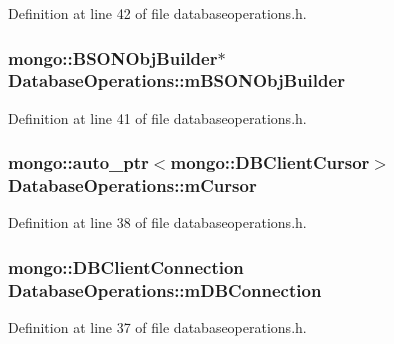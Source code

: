 Definition at line 42 of file databaseoperations.\-h.

\hypertarget{class_database_operations_ae6604cf6874bd9700ee3158c35945687}{
\subsubsection[{m\-B\-S\-O\-N\-Obj\-Builder}]{\setlength{\rightskip}{0pt plus 5cm}mongo\-::\-B\-S\-O\-N\-Obj\-Builder$\ast$ Database\-Operations\-::m\-B\-S\-O\-N\-Obj\-Builder\hspace{0.3cm}{\ttfamily [protected]}}}\label{class_database_operations_ae6604cf6874bd9700ee3158c35945687}


Definition at line 41 of file databaseoperations.\-h.

\hypertarget{class_database_operations_a0768987f8c116148aae4175cfc0df6bd}{
\subsubsection[{m\-Cursor}]{\setlength{\rightskip}{0pt plus 5cm}mongo\-::auto\-\_\-ptr$<$mongo\-::\-D\-B\-Client\-Cursor$>$ Database\-Operations\-::m\-Cursor\hspace{0.3cm}{\ttfamily [protected]}}}\label{class_database_operations_a0768987f8c116148aae4175cfc0df6bd}


Definition at line 38 of file databaseoperations.\-h.

\hypertarget{class_database_operations_a407ee7c24b774c93bd7d915566c84663}{
\subsubsection[{m\-D\-B\-Connection}]{\setlength{\rightskip}{0pt plus 5cm}mongo\-::\-D\-B\-Client\-Connection Database\-Operations\-::m\-D\-B\-Connection\hspace{0.3cm}{\ttfamily [protected]}}}\label{class_database_operations_a407ee7c24b774c93bd7d915566c84663}


Definition at line 37 of file databaseoperations.\-h.

